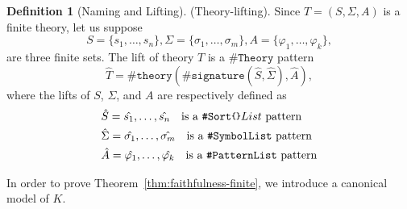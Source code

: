 \documentclass[UTF8,11pt]{article}
\newcounter{thmcounter}
\theoremstyle{plain}
\theoremstyle{definition}
\newtheorem{definition} [thmcounter]{Definition}
\theoremstyle{remark}
\newcommand{\parametric}[2]{{#1}\raisebox{.2ex}{\texttt{\footnotesize{\{}}}#2\raisebox{.2ex}{\texttt{\footnotesize{\}}}}}
\newcommand{\sharpsymbol}{\#}
\newcommand{\KSort}{\texttt{\sharpsymbol Sort}}
\newcommand{\KPatternList}{\texttt{\sharpsymbol PatternList}}
\newcommand{\KSymbolList}{\texttt{\sharpsymbol SymbolList}}
\newcommand{\Ksignature}{\texttt{\sharpsymbol signature}}
\newcommand{\KTheory}{\texttt{\sharpsymbol Theory}}
\newcommand{\Ktheory}{\texttt{\sharpsymbol theory}}
\begin{document}
\begin{definition}[Naming and Lifting]
	(Theory-lifting). Since $T = (S, \Sigma, A)$ is a finite theory, let us 
	suppose
	\begin{equation*}
	S = \{ s_1, \dots, s_n \}, 
	\Sigma = \{ \sigma_1, \dots, \sigma_m \}, 
	A = \{ \varphi_1, \dots, \varphi_k \},
	\end{equation*}
	are three finite sets. The lift of theory $T$ is a $\KTheory$ pattern 
	$$ \hat{T} = \Ktheory(\Ksignature(\hat{S}, \hat{\Sigma}), \hat{A}),$$
	where the lifts of $S$, $\Sigma$, and $A$ are respectively defined as
	\begin{align*}
	& \hat{S} = \hat{s_1},\dots,\hat{s_n} 
	\quad \text{is a $\parametric{\KSort}{}List$ pattern}
	\\
	& \hat{\Sigma} = \hat{\sigma_1},\dots,\hat{\sigma_m}
	\quad \text{is a $\KSymbolList$ pattern}
	\\
	& \hat{A} = \hat{\varphi_1}, \dots, \hat{\varphi_k}
	\quad \text{is a $\KPatternList$ pattern}
	\end{align*}
\end{definition}

In order to prove Theorem~\ref{thm:faithfulness-finite}, we introduce a 
canonical model of $K$.
\end{document}
